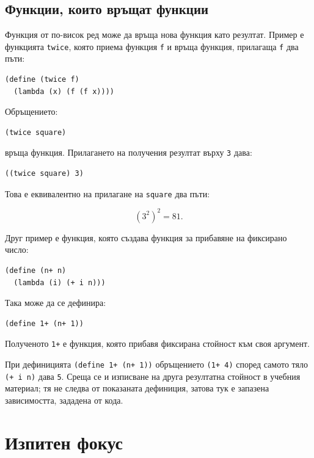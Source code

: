 \subsection{Функции, които връщат функции}\label{s:19.4.4}

Функция от по-висок ред може да връща нова функция като резултат. Пример е функцията \texttt{twice}, която приема функция \texttt{f} и връща функция, прилагаща \texttt{f} два пъти:

\begin{verbatim}
(define (twice f)
  (lambda (x) (f (f x))))
\end{verbatim}

Обръщението:

\begin{verbatim}
(twice square)
\end{verbatim}

връща функция. Прилагането на получения резултат върху \texttt{3} дава:

\begin{verbatim}
((twice square) 3)
\end{verbatim}

Това е еквивалентно на прилагане на \texttt{square} два пъти:

\[
(3^2)^2=81.
\]

Друг пример е функция, която създава функция за прибавяне на фиксирано число:

\begin{verbatim}
(define (n+ n)
  (lambda (i) (+ i n)))
\end{verbatim}

Така може да се дефинира:

\begin{verbatim}
(define 1+ (n+ 1))
\end{verbatim}

Полученото \texttt{1+} е функция, която прибавя фиксирана стойност към своя аргумент.

\begin{supp}
При дефиницията \texttt{(define 1+ (n+ 1))} обръщението \texttt{(1+ 4)} според самото тяло \texttt{(+ i n)} дава \texttt{5}. Среща се и изписване на друга резултатна стойност в учебния материал; тя не следва от показаната дефиниция, затова тук е запазена зависимостта, зададена от кода.
\end{supp}

\section{Изпитен фокус}\label{s:19.5}

